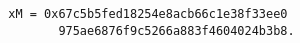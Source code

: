 \begin{verbatim}
        xM = 0x67c5b5fed18254e8acb66c1e38f33ee0
               975ae6876f9c5266a883f4604024b3b8.
\end{verbatim}
